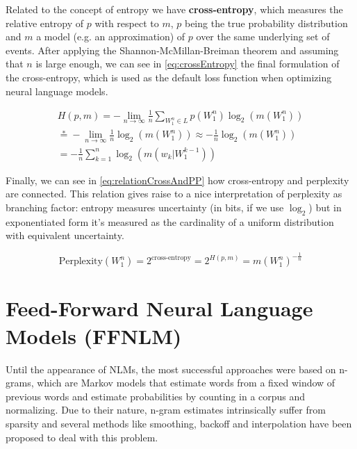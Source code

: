 Related to the concept of entropy we have \textbf{cross-entropy}, which measures the relative entropy of $p$ with respect to $m$, $p$ being the true probability distribution and $m$ a model (e.g. an approximation) of $p$ over the same underlying set of events. After applying the Shannon-McMillan-Breiman theorem and assuming that $n$ is large enough, we can see in \autoref{eq:crossEntropy} the final formulation of the cross-entropy, which is used as the default loss function when optimizing neural language models.

\begin{equation} \label{eq:crossEntropy}
	\begin{gathered}
		H(p,m) = -\lim\limits_{n \rightarrow \infty}\frac{1}{n}\sum_{W_1^n \in L}p(W_1^n)\log_2(m(W_1^n)) \\
		\stackrel{*}{=} -\lim\limits_{n \rightarrow \infty}\frac{1}{n}\log_2(m(W_1^n)) \approx -\frac{1}{n}\log_2(m(W_1^n)) \\
		= -\frac{1}{n}\sum_{k=1}^{n}\log_2(m(w_k|W_{1}^{k-1}))
	\end{gathered}
\end{equation}

Finally, we can see in \autoref{eq:relationCrossAndPP} how cross-entropy and perplexity are connected. This relation gives raise to a nice interpretation of perplexity as branching factor: entropy measures uncertainty (in bits, if we use $\log_2$) but in exponentiated form it's measured as the cardinality of a uniform distribution with equivalent uncertainty.

\begin{equation} \label{eq:relationCrossAndPP}
	\text{Perplexity}(W_1^n) = 2^{\text{cross-entropy}} = 2^{H(p,m)} = m(W_1^n)^{-\frac{1}{n}}
\end{equation}

\section{Feed-Forward Neural Language Models (FFNLM)}
\label{sec:forwardnlm}

Until the appearance of NLMs, the most successful approaches were based on n-grams, which are Markov models that estimate words from a fixed window of previous
words and estimate probabilities by counting in a corpus and normalizing. Due to their nature, n-gram estimates intrinsically suffer from sparsity and several methods like smoothing, backoff and interpolation have been proposed to deal with this problem.

